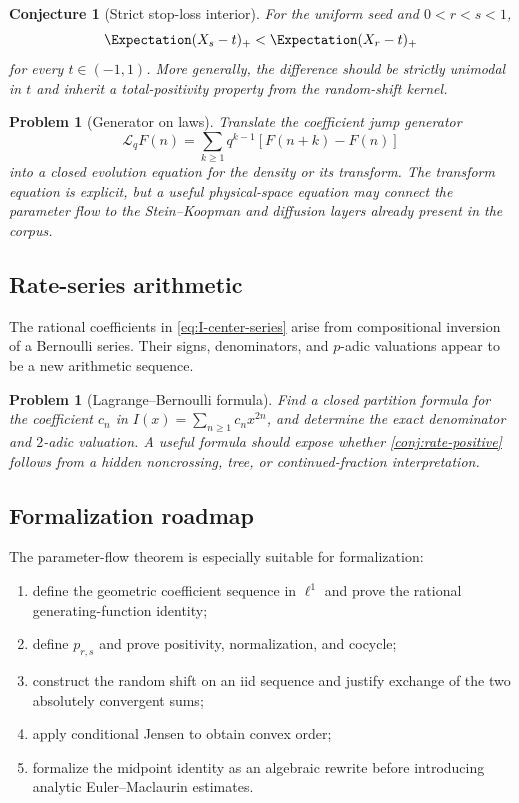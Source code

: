 \documentclass[11pt,a4paper]{article}
\newtheorem{conjecture}[theorem]{Conjecture}
\newtheorem{problem}[theorem]{Problem}
\theoremstyle{definition}
\begin{document}
\begin{conjecture}[Strict stop-loss interior]
For the uniform seed and $0<r<s<1$,
\[
 \Expectation(X_s-t)_+<\Expectation(X_r-t)_+
\]
for every $t\in(-1,1)$.  More generally, the difference should be strictly unimodal in $t$
and inherit a total-positivity property from the random-shift kernel.
\end{conjecture}

\begin{problem}[Generator on laws]
Translate the coefficient jump generator
\[
 \mathcal L_qF(n)=\sum_{k\ge1}q^{k-1}[F(n+k)-F(n)]
\]
into a closed evolution equation for the density or its transform.  The
transform equation is explicit, but a useful physical-space equation may
connect the parameter flow to the Stein--Koopman and diffusion layers already
present in the corpus.
\end{problem}

\subsection{Rate-series arithmetic}

The rational coefficients in \eqref{eq:I-center-series} arise from
compositional inversion of a Bernoulli series.  Their signs, denominators,
and $p$-adic valuations appear to be a new arithmetic sequence.

\begin{problem}[Lagrange--Bernoulli formula]
Find a closed partition formula for the coefficient $c_n$ in
$I(x)=\sum_{n\ge1}c_nx^{2n}$, and determine the exact denominator and
$2$-adic valuation.  A useful formula should expose whether
\cref{conj:rate-positive} follows from a hidden noncrossing, tree, or
continued-fraction interpretation.
\end{problem}

\subsection{Formalization roadmap}

The parameter-flow theorem is especially suitable for formalization:

\begin{enumerate}
\item define the geometric coefficient sequence in $\ell^1$ and prove the
rational generating-function identity;
\item define $p_{r,s}$ and prove positivity, normalization, and cocycle;
\item construct the random shift on an iid sequence and justify exchange of
the two absolutely convergent sums;
\item apply conditional Jensen to obtain convex order;
\item formalize the midpoint identity as an algebraic rewrite before
introducing analytic Euler--Maclaurin estimates.
\end{enumerate}
\end{document}
